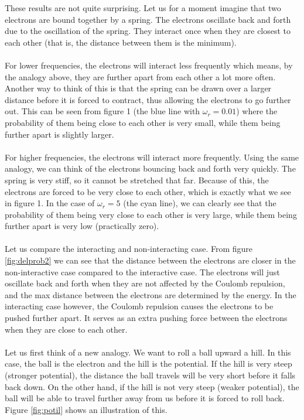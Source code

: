 \documentclass{article}
\begin{document}
These results are not quite surprising. Let us for a moment imagine that two electrons are bound together by a spring. The electrons oscillate back and forth due to the oscillation of the spring. They interact once when they are closest to each other (that is, the distance between them is the minimum).\\\\
For lower frequencies, the electrons will interact less frequently which means, by the analogy above, they are further apart from each other a lot more often. Another way to think of this is that the spring can be drawn over a larger distance before it is forced to contract, thus allowing the electrons to go further out. This can be seen from figure 1 (the blue line with $\omega_r = 0.01$) where the probability of them being close to each other is very small, while them being further apart is slightly larger.\\\\
For higher frequencies, the electrons will interact more frequently. Using the same analogy, we can think of the electrons bouncing back and forth very quickly. The spring is very stiff, so it cannot be stretched that far. Because of this, the electrons are forced to be very close to each other, which is exactly what we see in figure 1. In the case of $\omega_r = 5$ (the cyan line), we can clearly see that the probability of them being very close to each other is very large, while them being further apart is very low (practically zero).\\\\
Let us compare the interacting and non-interacting case. From figure \ref{fig:delprob2} we can see that the distance between the electrons are closer in the non-interactive case compared to the interactive case. The electrons will just oscillate back and forth when they are not affected by the Coulomb repulsion, and the max distance between the electrons are determined by the energy. In the interacting case however, the Coulomb repulsion causes the electrons to be pushed further apart. It serves as an extra pushing force between the electrons when they are close to each other.\\\\
Let us first think of a new analogy. We want to roll a ball upward a hill. In this case, the ball is the electron and the hill is the potential. If the hill is very steep (stronger potential), the distance the ball travels will be very short before it falls back down. On the other hand, if the hill is not very steep (weaker potential), the ball will be able to travel further away from us before it is forced to roll back. Figure \ref{fig:potil} shows an illustration of this.\\
\end{document}
